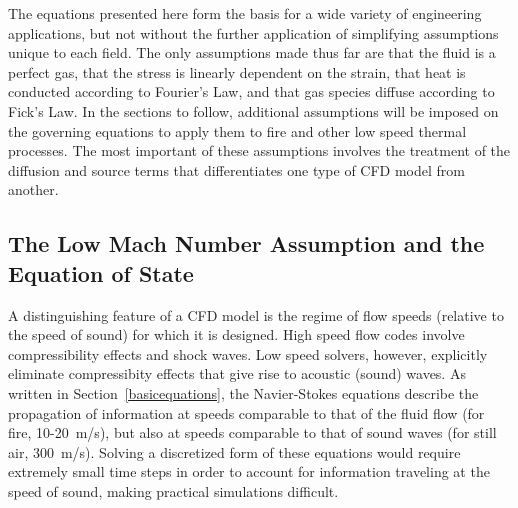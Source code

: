 \documentclass[11pt]{book}
\begin{document}
The equations presented here form the basis for a wide variety of engineering applications, but not without
the further application of simplifying assumptions unique to each field.
The only assumptions made thus far are that the fluid is a perfect gas, that the stress is
linearly dependent on the strain, that heat is conducted according to Fourier's Law, and that gas species diffuse according to
Fick's Law. In the sections to follow, additional assumptions will be
imposed on the governing equations to apply them to fire and other low speed thermal processes.
The most important of these assumptions involves the treatment of the diffusion and source
terms that differentiates one type of CFD model from
another.




\subsection{The Low Mach Number Assumption and the Equation of State}

A distinguishing feature of a CFD model is the regime of
flow speeds (relative to the speed of sound) for which it is designed. High
speed flow codes involve compressibility effects and shock waves. Low speed
solvers, however, explicitly eliminate compressibity effects that give rise
to acoustic (sound) waves. As written in Section~\ref{basicequations}, the Navier-Stokes equations describe the
propagation of information at speeds comparable to that of the fluid flow (for fire, 10-20~m/s),
but also at speeds comparable to that of sound waves (for still air,
300~m/s). Solving a discretized form of these equations would require extremely small
time steps in order to account for information traveling at the speed of sound, making
practical simulations difficult.
\end{document}
